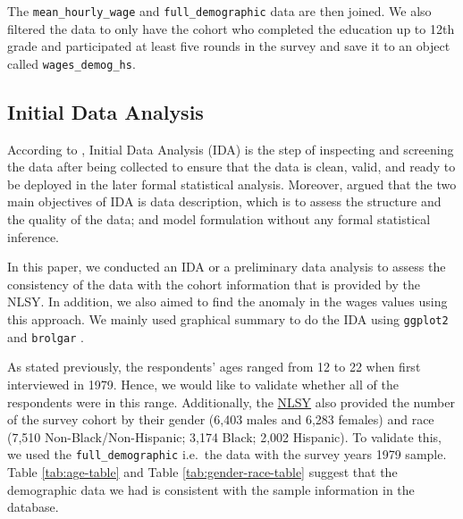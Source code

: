 The \texttt{mean\_hourly\_wage} and \texttt{full\_demographic} data are
then joined. We also filtered the data to only have the cohort who
completed the education up to 12th grade and participated at least five
rounds in the survey and save it to an object called
\texttt{wages\_demog\_hs}.

\hypertarget{initial-data-analysis}{%
\subsection{Initial Data Analysis}\label{initial-data-analysis}}

According to \citet{HuebnerMariannePhD2016Asat}, Initial Data Analysis
(IDA) is the step of inspecting and screening the data after being
collected to ensure that the data is clean, valid, and ready to be
deployed in the later formal statistical analysis. Moreover,
\citet{Chatfield1985TIEo} argued that the two main objectives of IDA is
data description, which is to assess the structure and the quality of
the data; and model formulation without any formal statistical
inference.

In this paper, we conducted an IDA or a preliminary data analysis to
assess the consistency of the data with the cohort information that is
provided by the NLSY. In addition, we also aimed to find the anomaly in
the wages values using this approach. We mainly used graphical summary
to do the IDA using \texttt{ggplot2}\citep{ggplot2} and \texttt{brolgar}
\citep{brolgar}.

As stated previously, the respondents' ages ranged from 12 to 22 when
first interviewed in 1979. Hence, we would like to validate whether all
of the respondents were in this range. Additionally, the
\href{https://www.nlsinfo.org/content/cohorts/nlsy79/intro-to-the-sample/nlsy79-sample-introduction}{NLSY}
also provided the number of the survey cohort by their gender (6,403
males and 6,283 females) and race (7,510 Non-Black/Non-Hispanic; 3,174
Black; 2,002 Hispanic). To validate this, we used the
\texttt{full\_demographic} i.e.~the data with the survey years 1979
sample. Table \ref{tab:age-table} and Table \ref{tab:gender-race-table}
suggest that the demographic data we had is consistent with the sample
information in the database.

